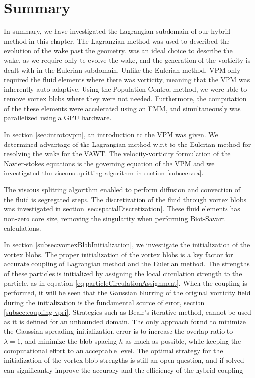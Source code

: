 \section{Summary}

In summary, we have investigated the Lagrangian subdomain of our hybrid method in this chapter. The Lagrangian method was used to described the evolution of the wake past the geometry.  was an ideal choice to describe the wake, as we require only to evolve the wake, and the generation of the vorticity is dealt with in the Eulerian subdomain. Unlike the Eulerian method, VPM only required the fluid elements where there was vorticity, meaning that the VPM was inherently auto-adaptive. Using the Population Control method, we were able to remove vortex blobs where they were not needed. Furthermore, the computation of the these elements were accelerated using an FMM, and simultaneously was parallelized using a GPU hardware. 

In section \ref{sec:introtovpm}, an introduction to the VPM was given. We determined advantage of the Lagrangian method w.r.t to the Eulerian method for resolving the wake for the VAWT. The velocity-vorticity formulation of the Navier-stokes equations is the governing equation of the VPM and we investigated the viscous splitting algorithm in section \ref{subsec:vsa}.

The viscous splitting algorithm enabled to perform diffusion and convection of the fluid is segregated steps. The discretization of the fluid through vortex blobs was investigated in section \ref{sec:spatialDiscretization}. These fluid elements has non-zero core size, removing the singularity when performing Biot-Savart calculations. 

In section \ref{subsec:vortexBlobInitialization}, we investigate the initialization of the vortex blobs. The proper initialization of the vortex blobs is a key factor for accurate coupling of Lagrangian method and the Eulerian method. The strengths of these particles is initialized by assigning the local circulation strength to the particle, as in equation \ref{eq:particleCirculationAssignment}. When the coupling is performed, it will be seen that the Gaussian blurring of the original vorticity field during the initialization is the fundamental source of error, section 	\ref{subsec:coupling-vpri}. Strategies such as Beale's iterative method, cannot be used as it is defined for an unbounded domain. The only approach found to minimize the Gaussian spreading initialization error is to increase the overlap ratio to $\lambda=1$, and minimize the blob spacing $h$ as much as possible, while keeping the computational effort to an acceptable level. The optimal strategy for the initialization of the vortex blob strengths is still an open question, and if solved can significantly improve the accuracy and the efficiency of the hybrid coupling

